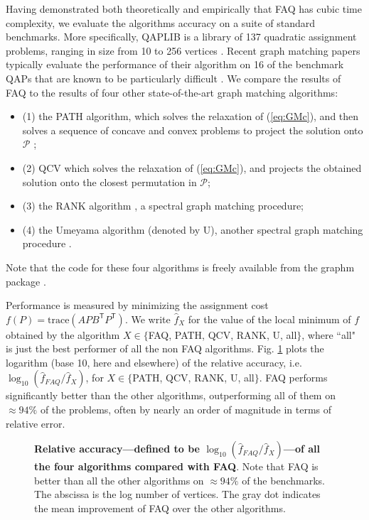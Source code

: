 \documentclass[10pt]{article}
\providecommand{\mc}[1]{\mathcal{#1}}
\providecommand{\mh}[1]{\hat{#1}}
\providecommand{\mc}[1]{\mathcal{#1}}
\providecommand{\mh}[1]{\hat{#1}}
\newcommand{\T}{^{\ensuremath{\mathsf{T}}}}
\begin{document}
Having demonstrated both theoretically and empirically that FAQ has cubic time complexity, we evaluate the algorithms accuracy on a suite of standard benchmarks.  More specifically, QAPLIB is a library of 137 quadratic assignment problems, ranging in size from 10 to 256 vertices \cite{Burkard1997}.  Recent graph matching papers typically evaluate the performance of their algorithm on 16 of the benchmark QAPs that are known to be particularly difficult \cite{Zaslavskiy2009,Schellewald2001}.  We compare the results of FAQ to the results of four other state-of-the-art graph matching algorithms: 
\begin{itemize}
\item[](1) the PATH algorithm, which solves the relaxation of (\ref{eq:GMc}), and then solves a sequence of concave and convex problems to project the solution onto $\mc{P}$ \cite{Zaslavskiy2009};
\item[](2) QCV which solves the relaxation of (\ref{eq:GMc}), and projects the obtained solution onto the closest permutation in $\mc{P}$;
\item[](3) the RANK algorithm \cite{Singh2007}, a spectral graph matching procedure;
\item[](4) the Umeyama algorithm (denoted by U), another spectral graph matching procedure \cite{Umeyama1988}.
\end{itemize}
  Note that the code for these four algorithms is freely available from the graphm package \cite{Zaslavskiy2009}.  

Performance is measured by minimizing the assignment cost $f(P)=\text{trace}(APB\T P\T)$.  We write $\mh{f}_X$ for the value of the local minimum of $f$ obtained by the algorithm $X \in \{$FAQ, PATH, QCV, RANK, U, all$\}$, where ``all" is just the best performer of all the non FAQ algorithms.
Fig. \ref{fig:allRelAccuracy} plots the logarithm (base 10, here and elsewhere) of the relative accuracy, i.e. $\log_{10}(\mh{f}_{FAQ}/\mh{f}_X)$, for $X \in \{$PATH, QCV, RANK, U, all$\}$.  FAQ performs significantly better than the other algorithms, outperforming all of them on $\approx 94\%$ of the problems, often by nearly an order of magnitude in terms of relative error.

\begin{figure}[htbp]
	\centering
	\caption{{\bf Relative accuracy---defined to be $\log_{10}(\mh{f}_{FAQ}/\mh{f}_X)$---of all the four algorithms compared with FAQ}.  Note that FAQ is better than all the other algorithms on $\approx 94\%$ of the benchmarks. The abscissa is the log number of vertices.  The gray dot indicates the mean improvement of FAQ over the other algorithms.}
	\label{fig:allRelAccuracy}
\end{figure}
\end{document}
